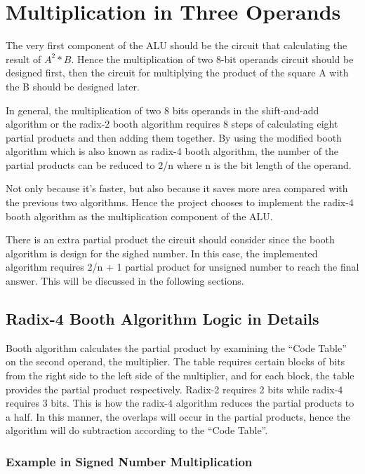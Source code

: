 \section{Multiplication in Three Operands}
The very first component of the ALU should be the circuit that calculating the result of
\textbf{\(A^2\ast B\)}.
Hence the multiplication of two 8-bit operands circuit should be designed first,
then the circuit for multiplying the product of the square A with the B should be designed later.

In general, the multiplication of two 8 bits operands in the shift-and-add algorithm or the radix-2 booth
algorithm requires 8 steps of calculating eight partial products and then adding them together.
By using the modified booth algorithm which is also known as radix-4 booth algorithm,
the number of the partial products can be reduced to 2/n where n is the bit length of the operand.

Not only because it’s faster, but also because it saves more area compared with the previous two algorithms.
Hence the project chooses to implement the radix-4 booth algorithm as the multiplication component of the ALU.

There is an extra partial product the circuit should consider since the booth algorithm is design for the sighed number.
In this case, the implemented algorithm requires 2/n + 1 partial product for unsigned number to reach the final answer.
This will be discussed in the following sections.

\subsection{Radix-4 Booth Algorithm Logic in Details}

Booth algorithm calculates the partial product by examining the “Code Table” on the second operand, the multiplier.
The table requires certain blocks of bits from the right side to the left side of the multiplier, and for each block,
the table provides the partial product respectively. Radix-2 requires 2 bits while radix-4 requires 3 bits.
This is how the radix-4 algorithm reduces the partial products to a half.
In this manner, the overlaps will occur in the partial products,
hence the algorithm will do subtraction according to the “Code Table”.

\subsubsection{Example in Signed Number Multiplication}

